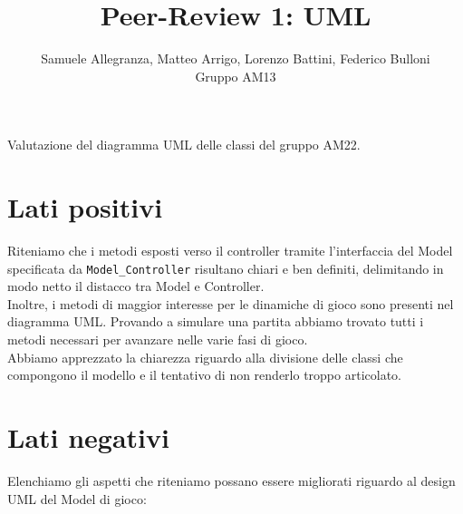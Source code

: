 \documentclass[12pt]{article}
\title{Peer-Review 1: UML}
\author{Samuele Allegranza, Matteo Arrigo, Lorenzo Battini, Federico Bulloni\\Gruppo AM13}
\begin{document}
\maketitle

Valutazione del diagramma UML delle classi del gruppo AM22.

\section{Lati positivi}
Riteniamo che i metodi esposti verso il controller tramite l'interfaccia del Model specificata da \texttt{Model\_Controller} risultano chiari e ben definiti, delimitando in modo netto il distacco tra Model e Controller.\\
Inoltre, i metodi di maggior interesse per le dinamiche di gioco sono presenti nel diagramma UML. Provando a simulare una partita abbiamo trovato tutti i metodi necessari per avanzare nelle varie fasi di gioco. \\
Abbiamo apprezzato la chiarezza riguardo alla divisione delle classi che compongono il modello e il tentativo di non renderlo troppo articolato.

\section{Lati negativi}

Elenchiamo gli aspetti che riteniamo possano essere migliorati riguardo al design UML del Model di gioco:
\end{document}
